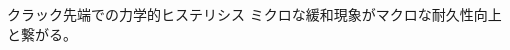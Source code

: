 \documentclass[12pt, dvipdfmx]{beamer}
\begin{document}
\begin{frame}
    \begin{alertblock}{クラック先端での力学的ヒステリシス}
    ミクロな緩和現象がマクロな耐久性向上と繋がる。
    \end{alertblock}
\end{frame}





\end{document}
